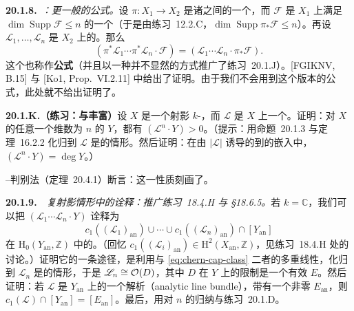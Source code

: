 \textbf{20.1.8.}\ \emph{\trhRemark：更一般的\trProjection{}公式。}\quad 设 $\pi\colon X_1\to X_2$ 是诸\trProper{}\trVariety{}之间的一个\trProper\trMorphism，而 $\mathscr{F}$ 是 $X_1$ 上满足 $\dim\operatorname{Supp}\mathscr{F}\le n$ 的一个\trCoherentSheaf（于是由\mbox{练习~12.2.C}，$\dim\operatorname{Supp}\pi_*\mathscr{F}\le n$）。再设 $\mathscr{L}_1,\dots,\mathscr{L}_n$ 是 $X_2$ 上的\trInvertibleSheaf。那么
\[
(\pi^*\mathscr{L}_1\cdots\pi^*\mathscr{L}_n\cdot\mathscr{F})=(\mathscr{L}_1\cdots\mathscr{L}_n\cdot\pi_*\mathscr{F}).
\]
这个也称作\textbf{\trProjection{}公式}（并且以一种并不显然的方式推广了\mbox{练习~20.1.J}）。[FGIKNV, B.15] 与 [Ko1, Prop.~VI.2.11] 中给出了证明。由于我们不会用到这个版本的\trProjection{}公式，此处就不给出证明了。

\textbf{20.1.K.（练习：与丰富\trLineBundle{}\trIntersection）}\quad 设 $X$ 是一个射影 $k$-\trVariety，而 $\mathscr{L}$ 是 $X$ 上一个\trAmple{}\trLineBundle。证明：对 $X$ 的任意一个维数为 $n$ 的\trSubvariety{} $Y$，都有 $(\mathscr{L}^n\cdot Y)>0$。（提示：用\mbox{命题~20.1.3} 与\mbox{定理~16.2.2} 化归到 $\mathscr{L}$ 是\trVeryAmple{}的情形。然后证明：在由\trLinearSystem{} $|\mathscr{L}|$ 诱导的到\trProjectiveSpace{}的嵌入中，$(\mathscr{L}^n\cdot Y)=\deg Y$。）

\trNakai--\trMoishezon{}判别法（\mbox{定理~20.4.1}）断言：这一性质刻画了\trAmpleness。

\textbf{20.1.9.}\ \extrahard\ \emph{复射影情形中的\trCohomology{}诠释：推广\mbox{练习~18.4.H} 与 \S18.6.5。}\quad 若 $k=\mathbb{C}$，我们可以把 $(\mathscr{L}_1\cdots\mathscr{L}_n\cdot Y)$ 诠释为
\begin{equation*}\tag{20.1.9.1}\label{eq:chern-cap-class}
c_1((\mathscr{L}_1)_{\mathrm{an}})\cup\cdots\cup c_1((\mathscr{L}_n)_{\mathrm{an}})\cap[Y_{\mathrm{an}}]
\end{equation*}
在 $\mathrm{H}_0(Y_{\mathrm{an}},\mathbb{Z})$ 中的\trDegree。（回忆 $c_1((\mathscr{L}_i)_{\mathrm{an}})\in\mathrm{H}^2(X_{\mathrm{an}},\mathbb{Z})$，见\mbox{练习~18.4.H} 处的讨论。）证明它的一条途径，是利用\trIntersectionProduct{}与 \eqref{eq:chern-cap-class} 二者的多重线性，化归到 $\mathscr{L}_n$ 是\trVeryAmple{}的情形，于是 $\mathscr{L}_n\cong\mathcal{O}(D)$，其中 $D$ 在 $Y$ 上的限制是一个有效\trCartierDivisor{} $E$。然后证明：若 $\mathscr{L}$ 是 $Y_{\mathrm{an}}$ 上的一个解析\trLineBundle{}（analytic line bundle），带有一个非零\trSection{} $E_{\mathrm{an}}$，则 $c_1(\mathscr{L})\cap[Y_{\mathrm{an}}]=[E_{\mathrm{an}}]$。最后，用对 $n$ 的归纳与\mbox{练习~20.1.D}。
